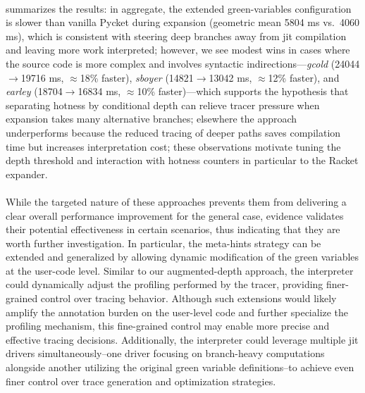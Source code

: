 
    \paragraph{}%
       summarizes the results: in aggregate, the extended green-variables configuration is slower than vanilla Pycket during expansion (geometric mean 5804 ms vs.\ 4060 ms), which is consistent with steering deep branches away from \gls{jit} compilation and leaving more work interpreted; however, we see modest wins in cases where the source code is more complex and involves syntactic indirections---\emph{gcold} (24044\(\rightarrow\)19716 ms, \(\approx\)18\% faster), \emph{sboyer} (14821\(\rightarrow\)13042 ms, \(\approx\)12\% faster), and \emph{earley} (18704\(\rightarrow\)16834 ms, \(\approx\)10\% faster)---which supports the hypothesis that separating hotness by conditional depth can relieve tracer pressure when expansion takes many alternative branches; elsewhere the approach underperforms because the reduced tracing of deeper paths saves compilation time but increases interpretation cost; these observations motivate tuning the depth threshold and interaction with hotness counters in particular to the Racket expander.

    \paragraph{}%
      While the targeted nature of these approaches prevents them from delivering a clear overall performance improvement for the general case, evidence validates their potential effectiveness in certain scenarios, thus indicating that they are worth further investigation. In particular, the meta-hints strategy can be extended and generalized by allowing dynamic modification of the green variables at the user-code level. Similar to our augmented-depth approach, the interpreter could dynamically adjust the profiling performed by the tracer, providing finer-grained control over tracing behavior. Although such extensions would likely amplify the annotation burden on the user-level code and further specialize the profiling mechanism, this fine-grained control may enable more precise and effective tracing decisions. Additionally, the interpreter could leverage multiple \gls{jit} drivers simultaneously--one driver focusing on branch-heavy computations alongside another utilizing the original green variable definitions--to achieve even finer control over trace generation and optimization strategies.

